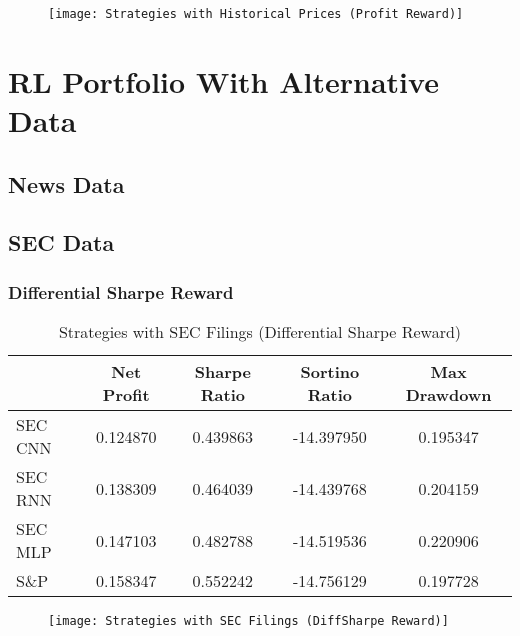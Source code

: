     \begin{center}
        \begin{figure}
        \texttt{[image: Strategies with Historical Prices (Profit Reward)]}
        \end{figure}
        \end{center}

\section{RL Portfolio With Alternative Data}

\subsection{News Data}


\subsection{SEC Data}

\subsubsection{Differential Sharpe Reward}

\begin{table}[htbp]
    \centering
    \caption{Strategies with SEC Filings (Differential Sharpe Reward)}
      \begin{tabular}{lcccc}
      \toprule
            & Net Profit & Sharpe Ratio & Sortino Ratio & Max Drawdown \\
      \midrule
      SEC CNN & 0.124870 & 0.439863 & -14.397950 & 0.195347 \\
      SEC RNN & 0.138309 & 0.464039 & -14.439768 & 0.204159 \\
      SEC MLP & 0.147103 & 0.482788 & -14.519536 & 0.220906 \\
      S\&P   & 0.158347 & 0.552242 & -14.756129 & 0.197728 \\
      \bottomrule
      \end{tabular}%
    \label{tab:addlabel}%
  \end{table}%

\begin{center}
    \begin{figure}
    \texttt{[image: Strategies with SEC Filings (DiffSharpe Reward)]}
    \end{figure}
\end{center}

